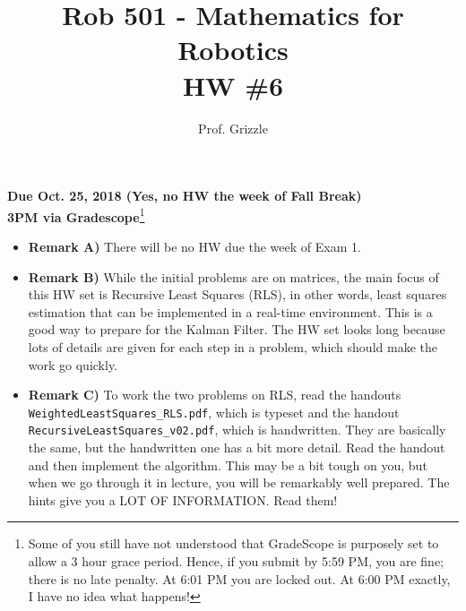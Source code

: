 \documentclass[letterpaper]{article}
\author{Prof. Grizzle}
\title{Rob 501 - Mathematics for Robotics\\
HW \#6}
\begin{document}
\date{}
\maketitle


 \newcommand{\trace}{\mathrm{trace}}
\newcommand{\real}{\mathbb R}  %
\newcommand{\nat}{\mathbb N}   %
\newcommand{\cp}{\mathbb C}    %
\newcommand{\ds}{\displaystyle}
\newcommand{\mf}[2]{\frac{\ds #1}{\ds #2}}
\newcommand{\Nagy}[2]{{Nagy, Page~#1, }{Prob.~#2}}
\newcommand{\spanof}[1]{\textrm{span} \{ #1 \}}
\newcommand{\argmin}{\arg\!\min}
\parindent 0pt


\begin{flushright}
{\bfseries Due Oct. 25, 2018 (Yes, no HW the week of Fall Break)} \\
{\bfseries 3PM via Gradescope}\footnote{Some of you still have not understood that GradeScope is purposely set to allow a 3 hour grace period. Hence, if you submit by 5:59 PM, you are fine; there is no late penalty. At 6:01 PM you are locked out. At 6:00 PM exactly, I have no idea what happens!} \\[3mm]
\end{flushright}



  \begin{itemize}
  \item{\textbf{Remark A)}}  There will be no HW due the week of Exam 1.

  \item{\textbf{Remark B)}} While the initial problems are on matrices, the main focus of this HW set is Recursive Least Squares (RLS), in other words, least squares estimation that can be implemented in a real-time environment. This is a good way to prepare for the Kalman Filter. The HW set looks long because lots of details are given for
each step in a problem, which should make the work go quickly.

  \item{\textbf{Remark C)}} To work the two problems on RLS, read the handouts \texttt{WeightedLeastSquares\_RLS.pdf}, which is typeset and the handout \texttt{RecursiveLeastSquares\_v02.pdf}, which is handwritten. They are basically the same, but the handwritten one has a bit more detail. Read the handout and then implement the algorithm. This may be a bit tough on you, but when we go through it in lecture, you will be remarkably well prepared. The hints give you a LOT OF INFORMATION. Read them!

  \end{itemize}
\end{document}
